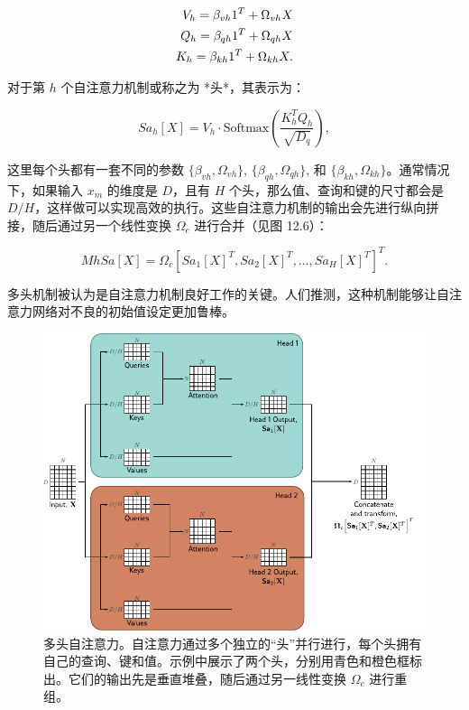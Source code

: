\documentclass[lang=cn,newtx,10pt,scheme=chinese]{elegantbook}
\begin{document}
\begin{align}
V_h = \beta_{vh}1^T + \Omega_{vh}X \notag \\
Q_h = \beta_{qh}1^T + \Omega_{qh}X \notag \\
K_h = \beta_{kh}1^T + \Omega_{kh}X. 
\end{align} 


对于第 \(h\) 个自注意力机制或称之为 *头*，其表示为：

\begin{equation}
Sa_h[X] = V_h \cdot \text{Softmax} \left( \frac{K_h^T Q_h}{\sqrt{D_q}} \right), 
\end{equation}

这里每个头都有一套不同的参数 \(\{\beta_{vh},\Omega_{vh}\}\), \(\{\beta_{qh},\Omega_{qh}\}\), 和 \(\{\beta_{kh},\Omega_{kh}\}\)。通常情况下，如果输入 \(x_m\) 的维度是 \(D\)，且有 \(H\) 个头，那么值、查询和键的尺寸都会是 \(D/H\)，这样做可以实现高效的执行。这些自注意力机制的输出会先进行纵向拼接，随后通过另一个线性变换 \(\Omega_c\) 进行合并（见图 12.6）：

\begin{equation}
MhSa[X] = \Omega_c \left[ Sa_1[X]^T, Sa_2[X]^T, \ldots, Sa_H[X]^T \right]^T . 
\end{equation}

多头机制被认为是自注意力机制良好工作的关键。人们推测，这种机制能够让自注意力网络对不良的初始值设定更加鲁棒。

\begin{figure}[ht!]
\centering
\includegraphics[width=0.7\linewidth]{PDFFigures/UDLChap12PDF/TransformerBlockSAMultiHead.pdf}
\caption{多头自注意力。自注意力通过多个独立的“头”并行进行，每个头拥有自己的查询、键和值。示例中展示了两个头，分别用青色和橙色框标出。它们的输出先是垂直堆叠，随后通过另一线性变换 \(\Omega_c\) 进行重组。}
\end{figure}
\end{document}
